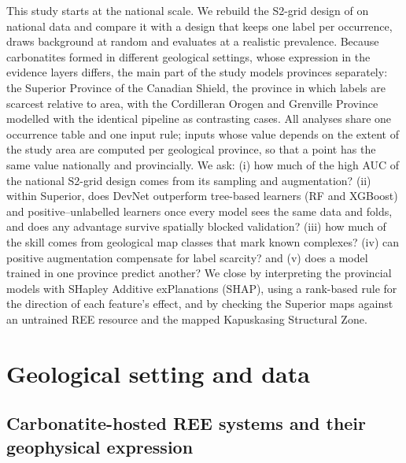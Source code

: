 \documentclass[pdflatex,sn-apa]{sn-jnl}
\begin{document}
This study starts at the national scale. We rebuild the S2-grid design of \citet{Parsa2024} on national data and compare it with a design that keeps one label per occurrence, draws background at random and evaluates at a realistic prevalence. Because carbonatites formed in different geological settings, whose expression in the evidence layers differs, the main part of the study models provinces separately: the Superior Province of the Canadian Shield, the province in which labels are scarcest relative to area, with the Cordilleran Orogen and Grenville Province modelled with the identical pipeline as contrasting cases. All analyses share one occurrence table and one input rule; inputs whose value depends on the extent of the study area are computed per geological province, so that a point has the same value nationally and provincially. We ask: (i) how much of the high AUC of the national S2-grid design comes from its sampling and augmentation? (ii) within Superior, does DevNet outperform tree-based learners (RF and XGBoost) and positive--unlabelled learners once every model sees the same data and folds, and does any advantage survive spatially blocked validation? (iii) how much of the skill comes from geological map classes that mark known complexes? (iv) can positive augmentation compensate for label scarcity? and (v) does a model trained in one province predict another? We close by interpreting the provincial models with SHapley Additive exPlanations (SHAP), using a rank-based rule for the direction of each feature's effect, and by checking the Superior maps against an untrained REE resource and the mapped Kapuskasing Structural Zone.

\section{Geological setting and data}\label{sec:data}

\subsection{Carbonatite-hosted REE systems and their geophysical expression}\label{sec:mineral-system}
\end{document}
